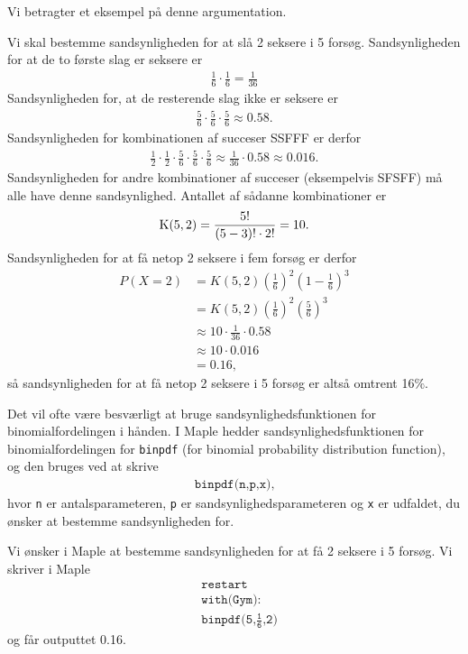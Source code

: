 Vi betragter et eksempel på denne argumentation.
\begin{exa}
	\label{exa:bin}
	Vi skal bestemme sandsynligheden for at slå 2 seksere i 5 forsøg. Sandsynligheden for at de to første slag er seksere er 
	\begin{align*}
		\frac{1}{6}\cdot \frac{1}{6} = \frac{1}{36}
	\end{align*}	
	Sandsynligheden for, at de resterende slag ikke er seksere er
	\begin{align*}
		\frac{5}{6}\cdot \frac{5}{6} \cdot \frac{5}{6} \approx 0.58.
	\end{align*}
	Sandsynligheden for kombinationen af succeser SSFFF er derfor
	\begin{align*}
		\frac{1}{2}\cdot \frac{1}{2}\cdot \frac{5}{6}\cdot \frac{5}{6} \cdot  \frac{5}{6} \approx \frac{1}{36} \cdot 0.58 \approx 0.016.
	\end{align*}
	Sandsynligheden for andre kombinationer af succeser (eksempelvis SFSFF) må alle have denne sandsynlighed. Antallet af sådanne kombinationer er
	\begin{align*}
		\textnormal{K}(5,2) = \frac{5!}{(5-3)!\cdot 2!} = 10.
	\end{align*}
	Sandsynligheden for at få netop 2 seksere i fem forsøg er derfor
	\begin{align*}
		P(X = 2) &= K(5,2)\left(\frac{1}{6} \right)^2\left(1 - \frac{1}{6}\right)^3 \\
				 &= K(5,2)\left(\frac{1}{6} \right)^2 \left(\frac{5}{6}\right)^3 \\
				 &\approx 10\cdot \frac{1}{36} \cdot 0.58 \\
				 &\approx 10 \cdot 0.016 \\
				 &= 0.16, 
	\end{align*}
	så sandsynligheden for at få netop 2 seksere i 5 forsøg er altså omtrent 16$\%$.
\end{exa}

Det vil ofte være besværligt at bruge sandsynlighedsfunktionen for binomialfordelingen i hånden. I Maple hedder sandsynlighedsfunktionen for binomialfordelingen for \texttt{binpdf} (for binomial probability distribution function), og den bruges ved at skrive
\begin{align*}
	\texttt{binpdf(n,p,x)},
\end{align*}
hvor \texttt{n} er antalsparameteren, \texttt{p} er sandsynlighedsparameteren og \texttt{x} er udfaldet, du ønsker at bestemme sandsynligheden for.
\begin{exa}
	Vi ønsker i Maple at bestemme sandsynligheden for at få 2 seksere i 5 forsøg. Vi skriver i Maple
	\begin{align*}
		&\texttt{restart}\\
		&\texttt{with(Gym):}\\
		&\texttt{binpdf(5,$\frac{\texttt{1}}{\texttt{6}}$,2})
	\end{align*}
	og får outputtet 0.16.
\end{exa}

